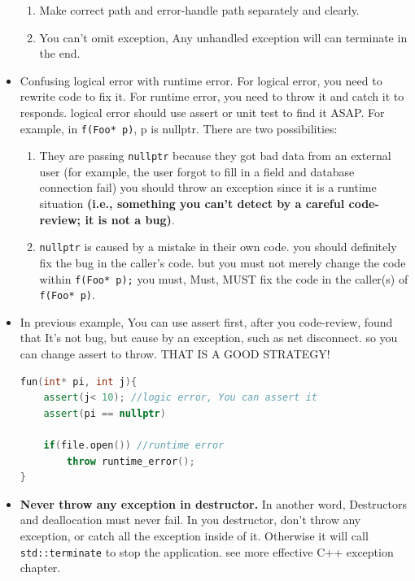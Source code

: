 \documentclass[a4paper,11pt,twoside]{book}
\begin{document}
\begin{itemize}
\begin{enumerate}
		\item Make correct path and error-handle path separately and clearly.
		
		\item You can't omit exception, Any unhandled exception will can terminate in the end.
	\end{enumerate}

\item Confusing logical error with runtime error. For logical error, you need to rewrite code to fix it. For runtime error, you need to throw it and catch it to responds. logical error should use assert  or unit test to find it ASAP. For example, in \texttt{f(Foo* p)}, p is nullptr. There are two possibilities:
\begin{enumerate}
	\item They are passing \texttt{nullptr} because they got bad data from an external user (for example, the user forgot to fill in a field and database connection fail) you should throw an exception since it is a runtime situation \textbf{(i.e., something you can't detect by a careful code-review; it is not a bug)}.
	
	\item \texttt{nullptr} is caused by a mistake in their own code. you should definitely fix the bug in the caller's code. but you must not merely change the code within \texttt{f(Foo* p);} you must, Must, MUST fix the code in the caller(s) of \texttt{f(Foo* p)}.
\end{enumerate}

	\item In previous example, You can use assert first, after you code-review, found that It's not bug, but cause by an exception, such as net disconnect. so you can change assert to throw. THAT IS  A GOOD STRATEGY!

\begin{lstlisting}[frame=single, language=c++]
fun(int* pi, int j){
	assert(j< 10); //logic error, You can assert it 
	assert(pi == nullptr)
	
	if(file.open()) //runtime error
		throw runtime_error();
}	
\end{lstlisting}

	\item \textbf{Never throw any exception in destructor.} In another word, Destructors and deallocation must never fail. In you destructor, don't throw any exception, or catch all the exception inside of it. Otherwise it will call \texttt{std::terminate} to stop the application. see more effective C++ exception chapter.
	

\end{itemize}
\end{document}
